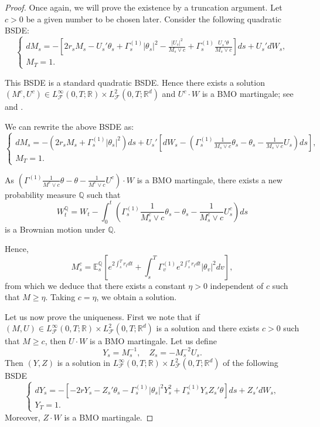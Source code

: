 \documentclass[final]{siamltex}
\begin{document}
\begin{proof}
 Once again, we will prove the existence by a truncation argument.
Let $c>0$ be a given number to be chosen later. Consider the following quadratic BSDE:
\begin{equation}\label{MUtrun}
\left\{\begin{array}{l}
        dM_s=-\left[2r_s M_s- U_s'\theta_s+\Gamma^{(1)}_s|\theta_s|^2- \frac{|U_s|^2}{M_s\vee c} +\Gamma^{(1)}_s \frac{U_s'\theta}{M_s\vee c} \right] ds+U_s' dW_s,\\
M_T=1.\end{array}\right.
\end{equation}

This BSDE is a standard quadratic BSDE. Hence there exists a solution $(M^{c},U^{c})\in L_{{\mathcal F}}^\infty(0,T;{\mathbb{R}})\times L_{{\mathcal F}}^2(0,T;{\mathbb{R}}^d)$
and $U^{c}\cdot W$ is a BMO martingale; see \cite{Koby} and \cite{Morlais}.

We can rewrite the above BSDE as:
\begin{equation}\label{MUtrun2}
\left\{\begin{array}{l}
        dM_s=-(2r_s M_s+\Gamma^{(1)}_s|\theta_s|^2)ds+U_s' [dW_s-(\Gamma^{(1)}_s \frac{1}{M_s\vee c}\theta_s-\theta_s- \frac{1}{M_s\vee c}U_s )ds],\\
M_T=1.\end{array}\right.
\end{equation}

As $(\Gamma^{(1)} \frac{1}{M^c\vee c}\theta-\theta- \frac{1}{M^c\vee c}U^c)\cdot W$ is a BMO martingale, there exists a new probability measure $\mathbb Q$ such that
$$W_t^{\mathbb Q} = W_t-\int_0^t \left(\Gamma^{(1)}_s \frac{1}{M^c_s\vee c}\theta_s-\theta_s- \frac{1}{M^c_s\vee c}U^c_s \right)ds$$
is a Brownian motion under $\mathbb Q$.

Hence,
$$M_s^c=\mathbb E_s^{\mathbb Q}\left[ e^{2\int_s^T r_tdt}+\int_s^T \Gamma^{(1)}_ve^{2\int_s^v r_tdt}|\theta_v|^2 dv\right],$$
from which we deduce that there exists a constant $\eta>0$ independent of $c$ such that $M\ge \eta$. Taking  $c= \eta$, we obtain a solution.

Let us now prove the uniqueness. First we note that if $(M,U)\in L_{{\mathcal F}}^\infty(0,T;{\mathbb{R}})\times L_{{\mathcal F}}^2(0,T;{\mathbb{R}}^d)$ is a  solution and there exists $c>0$ such that $M\ge c$, then $U\cdot W$ is a BMO martingale. Let us define
$$Y_s=M_s^{-1},\quad Z_s=-M_s^{-2}U_s.$$
Then $(Y,Z)$ is a solution in  $L_{{\mathcal F}}^\infty(0,T;{\mathbb{R}})\times L_{{\mathcal F}}^2(0,T;{\mathbb{R}}^d)   $  of the following BSDE
\begin{equation}\label{YZ}
\left\{\begin{array}{l}
        dY_s=-[-2r Y_s-Z_s'\theta_s-\Gamma^{(1)}_s|\theta_s|^2 Y_s^2+ \Gamma^{(1)}_s Y_sZ_s'\theta]ds+Z_s' dW_s,\\
Y_T=1.\end{array}\right.
\end{equation}
Moreover, $Z\cdot W$ is a BMO martingale.


\end{proof}
\end{document}
